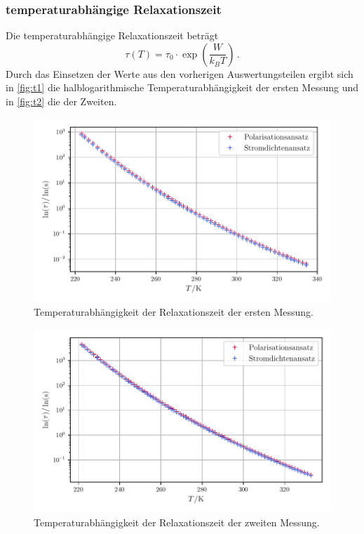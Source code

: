 \subsubsection{temperaturabhängige Relaxationszeit}
Die temperaturabhängige Relaxationszeit beträgt
\begin{equation}
    \tau(T) = \tau_0 \cdot \exp\left(\frac{W}{k_B T}\right)\, . 
\end{equation}
Durch das Einsetzen der Werte aus den vorherigen Auswertungsteilen ergibt sich in \autoref{fig:t1} die halblogarithmische Temperaturabhängigkeit der ersten Messung und
in \autoref{fig:t2} die der Zweiten.
\begin{figure}
    \centering
    \includegraphics[width=0.8\linewidth]{scripts/build/plot1_t.pdf}
    \caption{Temperaturabhängigkeit der Relaxationszeit der ersten Messung.}
    \label{fig:t1}
\end{figure}
\begin{figure}
    \centering
    \includegraphics[width=0.8\linewidth]{scripts/build/plot2_t.pdf}
    \caption{Temperaturabhängigkeit der Relaxationszeit der zweiten Messung.}
    \label{fig:t2}
\end{figure}